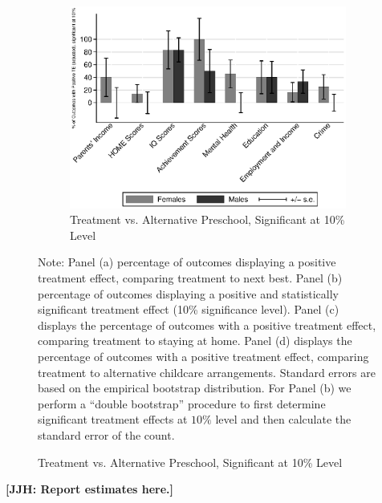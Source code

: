 \begin{figure}[!htbp]
\begin{subfigure}[h]{0.7\textwidth}
	\centering
	\caption{Treatment vs. Alternative Preschool, Significant at 10\% Level}
		\includegraphics[width=\textwidth]{output/epan_ipw_p1_cats1_sig10.eps}
\end{subfigure}
\scriptsize \justify
Note: Panel (a) percentage of outcomes displaying a positive treatment effect, comparing treatment to next best. Panel (b) percentage of outcomes displaying a positive and statistically significant treatment effect (10\% significance level). Panel (c) displays the percentage of outcomes with a positive treatment effect, comparing treatment to staying at home. Panel (d) displays the percentage of outcomes with a positive treatment effect, comparing treatment to alternative childcare arrangements. Standard errors are based on the empirical bootstrap distribution. For Panel (b) we perform a ``double bootstrap'' procedure to first determine significant treatment effects at $10\%$ level and then calculate the standard error of the count.\\
\end{figure}

\textbf{[JJH: Report estimates here.]}